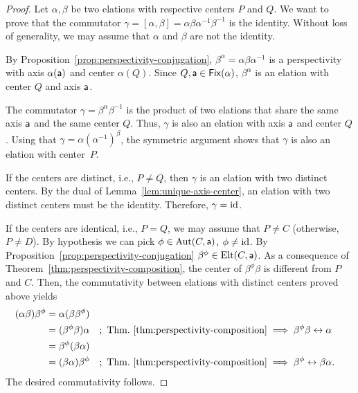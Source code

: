 \begin{proof}
    Let $\alpha,\beta$ be two elations with respective centers $P$ and $Q$. We want to prove that the commutator $\gamma = [\alpha,\beta] = \alpha\beta\alpha^{-1}\beta^{-1}$ is the identity. Without loss of generality, we may assume that $\alpha$ and $\beta$ are not the identity.

    By Proposition~\ref{prop:perspectivity-conjugation}, $\beta^\alpha = \alpha\beta\alpha^{-1}$ is a perspectivity with axis $\alpha(\mathsf a)$ and center $\alpha(Q)$. Since $Q,\mathsf a\in\operatorname{\mathsf{Fix}}(\alpha)$, $\beta^\alpha$ is an elation with center $Q$ and axis $\mathsf a$.

    The commutator $\gamma = \beta^\alpha\beta^{-1}$ is the product of two elations that share the same axis $\mathsf a$ and the same center $Q$. Thus, $\gamma$ is also an elation with axis $\mathsf a$ and center $Q$. Using that $\gamma=\alpha(\alpha^{-1})^\beta$, the symmetric argument shows that $\gamma$ is also an elation with center~$P$.

    If the centers are distinct, i.e., $P \ne Q$, then $\gamma$ is an elation with two distinct centers. By the dual of Lemma~\ref{lem:unique-axis-center}, an elation with two distinct centers must be the identity. Therefore, $\gamma=\operatorname{id}$.

    If the centers are identical, i.e., $P=Q$, we may assume that $P\ne C$ (otherwise, $P\ne D$). By hypothesis we can pick $\phi\in\operatorname{Aut}(C,\mathsf a)$, $\phi\ne\operatorname{id}$. By Proposition~\ref{prop:perspectivity-conjugation} $\beta^\phi\in\mathrm{Elt}(C,\mathsf a)$. As a consequence of Theorem~\ref{thm:perspectivity-composition}, the center of $\beta^\phi\beta$ is different from $P$ and $C$. Then, the commutativity between elations with distinct centers proved above yields
    \begin{align*}
        (\alpha\beta)\beta^\phi
            &= \alpha(\beta\beta^\phi)\\
            &= (\beta^\phi\beta)\alpha
                &&;\ \text{Thm.~\ref{thm:perspectivity-composition}}
                    \implies\beta^\phi\beta\comm\alpha\\
            &= \beta^\phi(\beta\alpha)\\
            &= (\beta\alpha)\beta^\phi
                &&;\ \text{Thm.~\ref{thm:perspectivity-composition}}
                    \implies\beta^\phi\comm\beta\alpha.
    \end{align*}
    The desired commutativity follows.
\end{proof}

